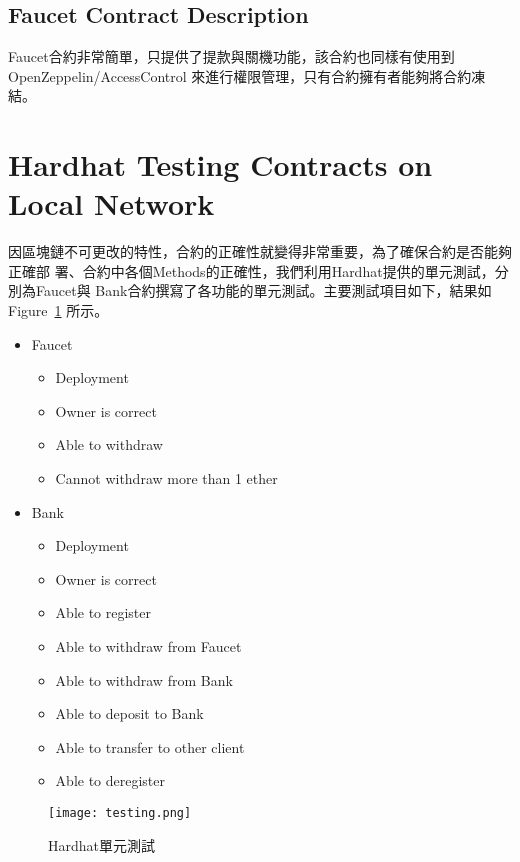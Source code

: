 \subsection{Faucet Contract Description}

Faucet合約非常簡單，只提供了提款與關機功能，該合約也同樣有使用到OpenZeppelin/AccessControl
來進行權限管理，只有合約擁有者能夠將合約凍結。

\section{Hardhat Testing Contracts on Local Network}
\label{sec:hardhat-testing}

因區塊鏈不可更改的特性，合約的正確性就變得非常重要，為了確保合約是否能夠正確部
署、合約中各個Methods的正確性，我們利用Hardhat提供的單元測試，分別為Faucet與
Bank合約撰寫了各功能的單元測試。主要測試項目如下，結果如Figure~\ref{fig:testing}
所示。

\begin{itemize}
  \item Faucet
  \begin{itemize}
    \item Deployment
    \item Owner is correct
    \item Able to withdraw
    \item Cannot withdraw more than 1 ether
  \end{itemize}
  \item Bank
  \begin{itemize}
    \item Deployment
    \item Owner is correct
    \item Able to register
    \item Able to withdraw from Faucet
    \item Able to withdraw from Bank
    \item Able to deposit to Bank
    \item Able to transfer to other client
    \item Able to deregister
  \end{itemize}
\end{itemize}

\begin{figure}[H]
    \centering
    \texttt{[image: testing.png]}
    \caption{Hardhat單元測試}
    \label{fig:testing}
\end{figure}

